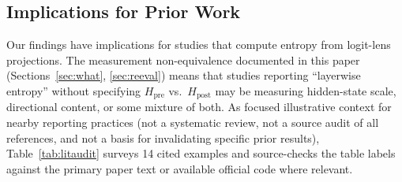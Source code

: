 \documentclass{ieeeaccess}
\newcommand{\Hpre}{H_{\text{pre}}}
\newcommand{\Hpost}{H_{\text{post}}}
\begin{document}
\subsection{Implications for Prior Work}
\label{sec:implications}

Our findings have implications for studies that compute entropy from logit-lens projections. The measurement non-equivalence documented in this paper (Sections~\ref{sec:what}, \ref{sec:reeval}) means that studies reporting ``layerwise entropy'' without specifying $\Hpre$ vs.\ $\Hpost$ may be measuring hidden-state scale, directional content, or some mixture of both. As focused illustrative context for nearby reporting practices (not a systematic review, not a source audit of all references, and not a basis for invalidating specific prior results), Table~\ref{tab:litaudit} surveys 14 cited examples and source-checks the table labels against the primary paper text or available official code where relevant.
\end{document}
